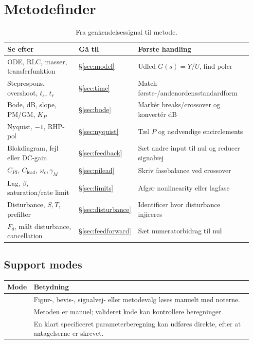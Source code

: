 \section{Metodefinder}

\begin{table}[htbp]
\centering
\caption{Fra genkendelsessignal til metode.}
\label{tab:metodefinder}
\begin{tabularx}{\textwidth}{@{}p{}Y Y@{}}
\toprule
Se efter & Gå til & Første handling \\
\midrule
ODE, RLC, masser, transferfunktion & \S\ref{sec:model} & Udled \(G(s)=Y/U\), find poler \\
Steprespons, overshoot, \(t_s\), \(t_r\) & \S\ref{sec:time} & Match første-/andenordensstandardform \\
Bode, dB, slope, PM/GM, \(K_P\) & \S\ref{sec:bode} & Markér breaks/crossover og konvertér dB \\
Nyquist, \(-1\), RHP-pol & \S\ref{sec:nyquist} & Tæl \(P\) og nødvendige encirclements \\
Blokdiagram, fejl eller DC-gain & \S\ref{sec:feedback} & Sæt andre input til nul og reducer signalvej \\
\(C_{PI}\), \(C_{\mathrm{lead}}\), \(\omega_c,\gamma_M\) & \S\ref{sec:pilead} & Skriv fasebalance ved crossover \\
Lag, \(\beta\), saturation/rate limit & \S\ref{sec:limits} & Afgør nonlinearity eller lagfase \\
Disturbance, \(S,T\), prefilter & \S\ref{sec:disturbance} & Identificer hvor disturbance injiceres \\
\(F_d\), målt disturbance, cancellation & \S\ref{sec:feedforward} & Sæt numeratorbidrag til nul \\
\bottomrule
\end{tabularx}
\end{table}

\subsection{Support modes}

\begin{tabularx}{\textwidth}{@{}p{}Y@{}}
\toprule
Mode & Betydning \\
\midrule
{} & Figur-, bevis-, signalvej- eller metodevalg løses manuelt med noterne.\\
 & Metoden er manuel; valideret kode kan kontrollere beregninger.\\
 & En klart specificeret parameterberegning kan udføres direkte, efter at antagelserne er skrevet.\\
\bottomrule
\end{tabularx}
